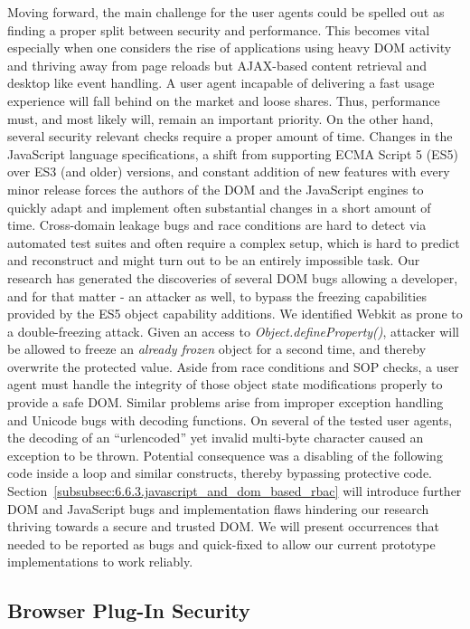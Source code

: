       Moving forward, the main challenge for the user agents could be spelled out as finding a proper split between security and performance. This becomes vital especially when one considers the rise of applications using heavy DOM activity and thriving away from page reloads but AJAX-based content retrieval and desktop like event handling. A user agent incapable of delivering a fast usage experience will fall behind on the market and loose shares. Thus, performance must, and most likely will, remain an important priority. On the other hand, several security relevant checks require a proper amount of time. Changes in the JavaScript language specifications, a shift from supporting ECMA Script 5 (ES5) over ES3 (and older) versions, and constant addition of new features with every minor release forces the authors of the DOM and the JavaScript engines to quickly adapt and implement often substantial changes in a short amount of time. Cross-domain leakage bugs and race conditions are hard to detect 
via automated test suites and often require a complex setup, which is hard to predict and reconstruct and might turn out to be an entirely impossible task. Our research has generated the discoveries of several DOM bugs allowing a developer, and for that matter - an attacker as well, to bypass the freezing capabilities provided by the ES5 object capability additions. We identified Webkit as prone to a double-freezing attack. Given an access to \textit{Object.defineProperty()}, attacker will be allowed to freeze an \textit{already frozen} object for a second time, and thereby overwrite the protected value. Aside from race conditions and SOP checks, a user agent must handle the integrity of those object state modifications properly to provide a safe DOM. Similar problems arise from improper exception handling and Unicode bugs with decoding functions. On several of the tested user agents, the decoding of an ``urlencoded'' yet invalid multi-byte character caused an exception to be thrown. Potential consequence 
was a disabling of the following code inside a loop and similar constructs, thereby bypassing protective code. Section~\ref{subsubsec:6.6.3.javascript_and_dom_based_rbac} will introduce further DOM and JavaScript bugs and implementation flaws hindering our research thriving towards a secure and trusted DOM. We will present occurrences that needed to be reported as bugs and quick-fixed to allow our current prototype implementations to work reliably.

    \subsection{Browser Plug-In Security}
    \label{subsubsec:2.4.3.plugin_and_extension_security}

